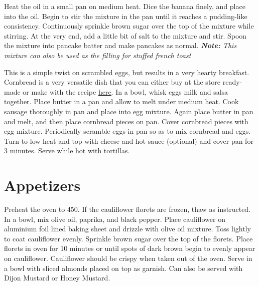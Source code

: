 \documentclass[oneside]{recipe}
\begin{document}
Heat the oil in a small pan on medium heat. Dice the banana finely, and place into the oil. Begin to stir the mixture in the pan until it reaches a pudding-like consistency. 
Continuously sprinkle brown sugar over the top of the mixture while stirring. At the very end, add a little bit of salt to the mixture and stir. Spoon the mixture into pancake batter and make pancakes as normal. \textit{\textbf{Note:} This mixture can also be used as the filling for stuffed french toast}

This is a simple twist on scrambled eggs, but results in a very hearty breakfast. Cornbread is a very versatile dish that you can either buy at the store ready-made or make with the recipe \href{}{\underline{here}}. In a bowl, whisk eggs milk and salsa together. Place butter in a pan and allow to melt under medium heat. Cook sausage thoroughly in pan and place into egg mixture. Again place butter in pan and melt, and then place cornbread pieces on pan. Cover cornbread pieces with egg mixture. Periodically scramble eggs in pan so as to mix cornbread and eggs. Turn to low heat and top with cheese and hot sauce (optional) and cover pan for 3 minutes. Serve while hot with tortillas. 



\chapter{Appetizers}
Preheat the oven to 450. If the cauliflower florets are frozen, thaw as instructed. In a bowl, mix olive oil, paprika, and black pepper. Place cauliflower on aluminium foil lined baking sheet and drizzle with olive oil mixture. Toss lightly to coat cauliflower evenly. Sprinkle brown sugar over the top of the florets. Place florets in oven for 10 minutes or until spots of dark brown begin to evenly appear on cauliflower. Cauliflower should be crispy when taken out of the oven. Serve in a bowl with sliced almonds placed on top as garnish. Can also be served with Dijon Mustard or Honey Mustard.
\end{document}
